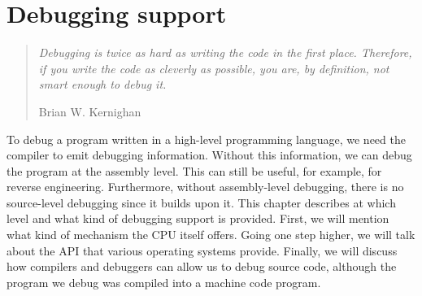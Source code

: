 \chapter{Debugging support}

\begin{quote}
  \textit{Debugging is twice as hard as writing the code in the first place.
    Therefore, if you write the code as cleverly as possible, you are, by
    definition, not smart enough to debug it.}\begin{flushright}
    \scriptsize{Brian W. Kernighan}
  \end{flushright}
\end{quote}

To debug a program written in a high-level programming language, we need the
compiler to emit debugging information. Without this information, we can debug
the program at the assembly level. This can still be useful, for example, for
reverse engineering. Furthermore, without assembly-level debugging, there is no
source-level debugging since it builds upon it. This chapter describes at which
level and what kind of debugging support is provided. First, we will mention
what kind of mechanism the CPU itself offers. Going one step higher, we will
talk about the API that various operating systems provide. Finally, we will
discuss how compilers and debuggers can allow us to debug source code, although
the program we debug was compiled into a machine code program.

